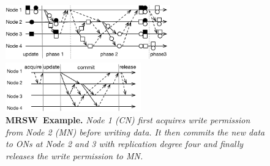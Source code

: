 \documentclass[sigconf]{acmart}
\newcommand{\DIFdelFL}[1]{}
\renewcommand{\em}{\it}
\newcommand{\mycaption}[3]{\caption{\label{#1}{\bf #2} \em\small #3}}
\newcommand{\mrmw}{MRMW}
\newcommand{\mrsw}{MRSW}
\newcommand{\on}{ON}
\newcommand{\xn}{CN}
\newcommand{\master}{MN}
\providecommand{\DIFdel}[1]{{\protect\color{red}\sout{#1}}}                      %
\providecommand{\DIFdelend}{} %
\providecommand{\DIFdelFL}[1]{\DIFdel{#1}} %
\providecommand{\DIFaddbeginFL}{} %
\providecommand{\DIFaddendFL}{} %
\providecommand{\DIFdelbeginFL}{} %
\providecommand{\DIFdelendFL}{} %
\begin{document}
{%
\DIFdelend {
\begin{figure}[th]
\begin{minipage}{3.4in}
\begin{center}
\centerline{\includegraphics[width=2.8in]{Figures/commit.pdf}}
\DIFdelbeginFL %
\DIFdelendFL \DIFaddbeginFL \vspace{-0.15in}
\DIFaddendFL \mycaption{fig-mrmw}{\mrmw\ Commit Example.}
{
Solid arrows represent data communication.
Dashed arrows represent metadata communication.
Node 1 (\xn) commit data to \on{}s at Node 2 and 3 with replication degree four.
Black shapes represent old committed states before the update
and white shapes represent new states.
}
\end{center}
\end{minipage}
\begin{minipage}{0.01in}
\DIFdelbeginFL \DIFdelFL{\hspace{0.01in}
}\DIFdelendFL %
\end{minipage}
\begin{minipage}{3in}
\begin{center}
\centerline{\includegraphics[width=2.3in]{Figures/mrsw.pdf}}
\DIFaddbeginFL \vspace{-0.15in}
\DIFaddendFL \mycaption{fig-mrsw}{\mrsw\ Example.}
{
Node 1 (\xn) first acquires write permission from Node 2 (\master)
before writing data.
It then commits the new data to \on{}s at Node 2 and 3 with replication degree four
and finally releases the write permission to \master.
}
\end{center}
\end{minipage}
\end{figure}}}
\end{document}

